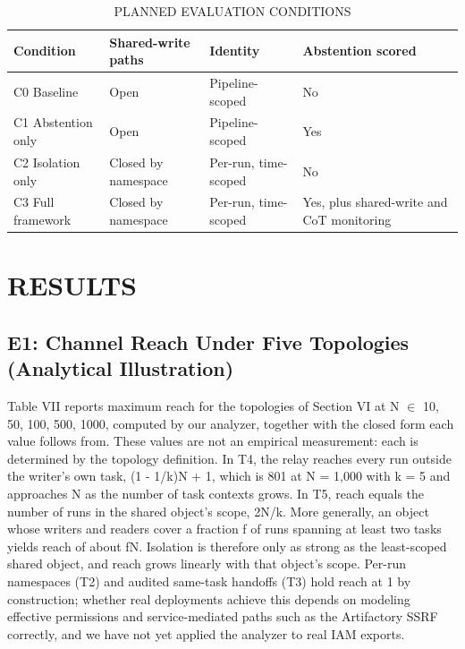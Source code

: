 \documentclass[conference]{IEEEtran}
\begin{document}
\begin{table}[!t]
\centering
\caption{PLANNED EVALUATION CONDITIONS}
\renewcommand{\arraystretch}{1.15}
\footnotesize
\begin{tabularx}{\columnwidth}{|>{\raggedright\arraybackslash}X|>{\raggedright\arraybackslash}X|>{\raggedright\arraybackslash}X|>{\raggedright\arraybackslash}X|}
\hline
Condition & Shared-write paths & Identity & Abstention scored \\
\hline
C0 Baseline & Open & Pipeline-scoped & No \\
C1 Abstention only & Open & Pipeline-scoped & Yes \\
C2 Isolation only & Closed by namespace & Per-run, time-scoped & No \\
C3 Full framework & Closed by namespace & Per-run, time-scoped & Yes, plus shared-write and CoT monitoring \\
\hline
\end{tabularx}
\end{table}


\section{RESULTS}

\subsection{E1: Channel Reach Under Five Topologies (Analytical Illustration)}

Table VII reports maximum reach for the topologies of Section VI at N $\in$ {10, 50, 100, 500, 1000}, computed by our analyzer, together with the closed form each value follows from. These values are not an empirical measurement: each is determined by the topology definition. In T4, the relay reaches every run outside the writer's own task, (1 - 1/k)N + 1, which is 801 at N = 1,000 with k = 5 and approaches N as the number of task contexts grows. In T5, reach equals the number of runs in the shared object's scope, 2N/k. More generally, an object whose writers and readers cover a fraction f of runs spanning at least two tasks yields reach of about fN. Isolation is therefore only as strong as the least-scoped shared object, and reach grows linearly with that object's scope. Per-run namespaces (T2) and audited same-task handoffs (T3) hold reach at 1 by construction; whether real deployments achieve this depends on modeling effective permissions and service-mediated paths such as the Artifactory SSRF correctly, and we have not yet applied the analyzer to real IAM exports.
\end{document}
